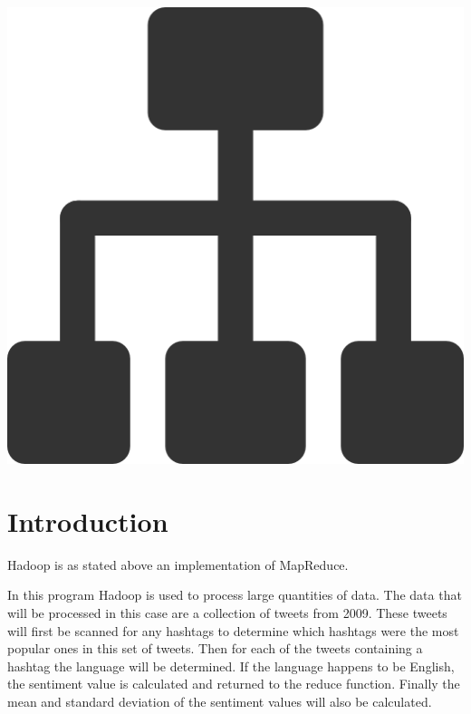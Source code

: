 \documentclass[a4paper,12px]{article}
\begin{document}
\vspace{2cm}
\begin{center}
    \includegraphics[width=(\textwidth/5*3)]{parallel_tasks}
\end{center}
\clearpage

\tableofcontents
\vspace{5mm}


\section{Introduction}

Hadoop is as stated above an implementation of MapReduce.

In this program Hadoop is used to process large quantities of data. The data
that will be processed in this case are a collection of tweets from 2009. These
tweets will first be scanned for any hashtags to determine which hashtags were
the most popular ones in this set of tweets. Then for each of the tweets
containing a hashtag the language will be determined. If the language happens to
be English, the sentiment value is calculated and returned to the reduce
function. Finally the mean and standard deviation of the sentiment values will
also be calculated.
\end{document}
